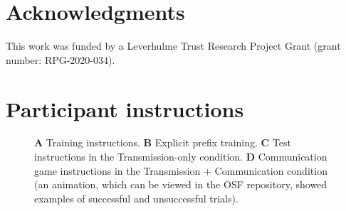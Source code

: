 \documentclass[doc,biblatex]{apa7}
\begin{document}

\section{Acknowledgments}

\noindent This work was funded by a Leverhulme Trust Research Project Grant (grant number: RPG-2020-034).

\printbibliography


\clearpage

\appendix

\section{Participant instructions}

\begin{figure}[h!]
\vspace*{2pt}
\caption{\textbf{A} Training instructions. \textbf{B} Explicit prefix training. \textbf{C} Test instructions in the Transmission-only condition. \textbf{D} Communication game instructions in the Transmission + Communication condition (an animation, which can be viewed in the OSF repository, showed examples of successful and unsuccessful trials).}
\label{supp_training}
\end{figure}
\end{document}
